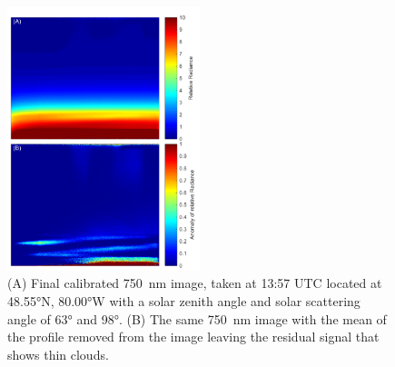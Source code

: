 \documentclass[12pt]{article}
\begin{document}
\begin{figure}
    \begin{subfigure}[t]{0\textwidth}
        \label{fig:AfterImagesHorizontalDependance:a}
    \end{subfigure}
    \begin{subfigure}[t]{0\textwidth}
         \label{fig:AfterImagesHorizontalDependance:b}
    \end{subfigure}
    \includegraphics[width=0.50\textwidth]{./Images/5-2-AfterImage.pdf}
    \caption{(A) Final calibrated 750~nm image, taken at 13:57 UTC located at 48.55\si{\degree}N, 80.00\si{\degree}W with a solar zenith angle and solar scattering angle of 63\si{\degree} and 98\si{\degree}. (B) The same 750~nm image with the mean of the profile removed from the image leaving the residual signal that shows thin clouds.}
    \label{fig:AfterImagesHorizontalDependance}
\end{figure}

\clearpage
\end{document}
